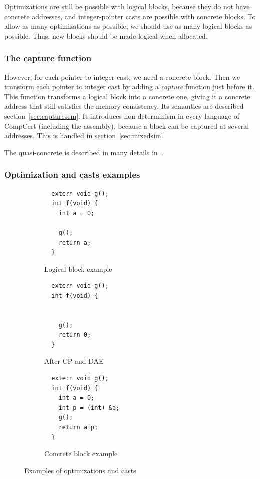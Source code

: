 Optimizations are still be possible with logical blocks, because they do not have concrete addresses, and integer-pointer casts are possible with concrete blocks.
To allow as many optimizations as possible, we should use as many logical blocks as possible. Thus, new blocks should be made logical when allocated.

\subsubsection{The capture function}
However, for each pointer to integer cast, we need a concrete block. Then we transform each pointer to integer cast by adding a \textit{capture} function just before it. This function transforms a logical block into a concrete one, giving it a concrete address that still satisfies the memory consistency. Its semantics are described section~\ref{sec:capturesem}.
It introduces non-determinism in every language of CompCert (including the assembly), because a block can be captured at several addresses. This is handled in section~\ref{sec:mixedsim}.

The quasi-concrete is described in many details in~\cite{DBLP:conf/pldi/KangHMGZV15}.
\subsubsection{Optimization and casts examples}

\lstset{}
\begin{figure}
\begin{subfigure}{.33\textwidth}
  \begin{lstlisting}
  extern void g();
  int f(void) {
    int a = 0;
    
    g();
    return a;
  }
  \end{lstlisting}
  \caption{Logical block example}
  \label{fig:logical}
\end{subfigure}%
\begin{subfigure}{.33\textwidth}
  \begin{lstlisting}
  extern void g();
  int f(void) {

    
    g();
    return 0;
  }
  \end{lstlisting}
  \caption{After CP and DAE}
  \label{fig:cpdae}
\end{subfigure}
\begin{subfigure}{.33\textwidth}
  \begin{lstlisting}
  extern void g();
  int f(void) {
    int a = 0;
    int p = (int) &a;
    g();
    return a+p;
  }
  \end{lstlisting}
  \caption{Concrete block example}
  \label{fig:concrete}
\end{subfigure}
\caption{Examples of optimizations and casts}
\label{fig:examples}
\end{figure}

